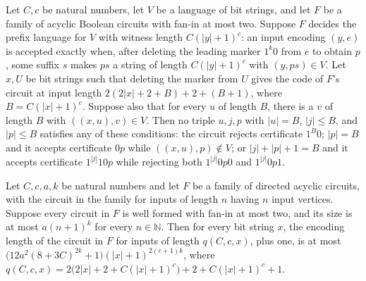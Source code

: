 \begin{theorem}
\label{Complexity.KarpLipton.allGood_of_decides}
\leanok
{}
Let $C,c$ be natural numbers, let $V$ be a language of bit strings, and let $F$ be a
family of acyclic Boolean circuits with fan-in at most two. Suppose $F$ decides the prefix
language for $V$ with witness length $C(|y|+1)^c$: an input encoding $(y,e)$ is accepted
exactly when, after deleting the leading marker $1^k0$ from $e$ to obtain $p$, some suffix
$s$ makes $ps$ a string of length $C(|y|+1)^c$ with $(y,ps)\in V$. Let $x,U$ be bit
strings such that deleting the marker from $U$ gives the code of $F$'s circuit at input
length $2(2|x|+2+B)+2+(B+1)$, where $B=C(|x|+1)^c$. Suppose also that for every $u$ of
length $B$, there is a $v$ of length $B$ with $((x,u),v)\in V$. Then no triple $u,j,p$
with $|u|=B$, $|j|\le B$, and $|p|\le B$ satisfies any of these conditions: the circuit
rejects certificate $1^B0$; $|p|=B$ and it accepts certificate $0p$ while
$((x,u),p)\notin V$; or $|j|+|p|+1=B$ and it accepts certificate $1^{|j|}10p$ while
rejecting both $1^{|j|}0p0$ and $1^{|j|}0p1$.
\end{theorem}

\begin{theorem}
\label{Complexity.KarpLipton.length_encode_le}
\leanok
{}
Let $C,c,a,k$ be natural numbers and let $F$ be a family of directed acyclic circuits,
with the circuit in the family for inputs of length $n$ having $n$ input vertices.
Suppose every circuit in $F$ is well formed with fan-in at most two, and its size is at
most $a(n+1)^k$ for every $n\in\mathbb{N}$. Then for every bit string $x$, the encoding
length of the circuit in $F$ for inputs of length $q(C,c,x)$, plus one, is at most
$\bigl(12a^2(8+3C)^{2k}+1\bigr)(|x|+1)^{2(c+1)k}$, where
$q(C,c,x)=2\bigl(2|x|+2+C(|x|+1)^c\bigr)+2+C(|x|+1)^c+1$.
\end{theorem}

